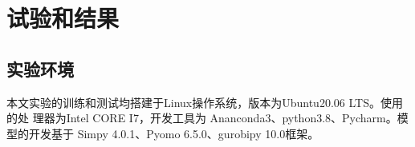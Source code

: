 \section{试验和结果}
\subsection{实验环境}
本文实验的训练和测试均搭建于Linux操作系统，版本为Ubuntu20.06 LTS。使用的处
理器为Intel CORE I7，开发工具为 Ananconda3、python3.8、Pycharm。模型的开发基于
Simpy 4.0.1、Pyomo 6.5.0、gurobipy 10.0框架。








